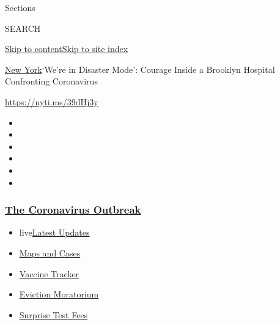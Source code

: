 Sections

SEARCH

\protect\hyperlink{site-content}{Skip to
content}\protect\hyperlink{site-index}{Skip to site index}

\href{/section/nyregion}{New York}\textbar{}`We're in Disaster Mode':
Courage Inside a Brooklyn Hospital Confronting Coronavirus

\url{https://nyti.ms/39dHj3y}

\begin{itemize}
\item
\item
\item
\item
\item
\item
\end{itemize}

\hypertarget{the-coronavirus-outbreak}{%
\subsubsection{\texorpdfstring{\href{https://www.nytimes3xbfgragh.onion/news-event/coronavirus?name=styln-coronavirus-national\&region=TOP_BANNER\&block=storyline_menu_recirc\&action=click\&pgtype=Article\&impression_id=0c771520-f2b3-11ea-8935-6965980a26b7\&variant=undefined}{The
Coronavirus
Outbreak}}{The Coronavirus Outbreak}}\label{the-coronavirus-outbreak}}

\begin{itemize}
\tightlist
\item
  live\href{https://www.nytimes3xbfgragh.onion/2020/09/09/world/covid-19-coronavirus.html?name=styln-coronavirus-national\&region=TOP_BANNER\&block=storyline_menu_recirc\&action=click\&pgtype=Article\&impression_id=0c773c30-f2b3-11ea-8935-6965980a26b7\&variant=undefined}{Latest
  Updates}
\item
  \href{https://www.nytimes3xbfgragh.onion/interactive/2020/us/coronavirus-us-cases.html?name=styln-coronavirus-national\&region=TOP_BANNER\&block=storyline_menu_recirc\&action=click\&pgtype=Article\&impression_id=0c773c31-f2b3-11ea-8935-6965980a26b7\&variant=undefined}{Maps
  and Cases}
\item
  \href{https://www.nytimes3xbfgragh.onion/interactive/2020/science/coronavirus-vaccine-tracker.html?name=styln-coronavirus-national\&region=TOP_BANNER\&block=storyline_menu_recirc\&action=click\&pgtype=Article\&impression_id=0c773c32-f2b3-11ea-8935-6965980a26b7\&variant=undefined}{Vaccine
  Tracker}
\item
  \href{https://www.nytimes3xbfgragh.onion/2020/09/02/your-money/eviction-moratorium-covid.html?name=styln-coronavirus-national\&region=TOP_BANNER\&block=storyline_menu_recirc\&action=click\&pgtype=Article\&impression_id=0c773c33-f2b3-11ea-8935-6965980a26b7\&variant=undefined}{Eviction
  Moratorium}
\item
  \href{https://www.nytimes3xbfgragh.onion/2020/09/09/upshot/coronavirus-surprise-test-fees.html?name=styln-coronavirus-national\&region=TOP_BANNER\&block=storyline_menu_recirc\&action=click\&pgtype=Article\&impression_id=0c773c34-f2b3-11ea-8935-6965980a26b7\&variant=undefined}{Surprise
  Test Fees}
\end{itemize}

